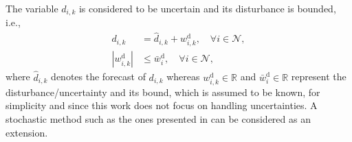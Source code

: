 The variable $d_{i,k}$ is considered to be uncertain and its disturbance is bounded, i.e.,
\begin{align}
{d}_{i,k}&=\hat{d}_{i,k} + w_{i,k}^{\mathrm{d}}, \quad \forall i \in \mathcal{N}, \label{eq:ul}\\
|w_{i,k}^{\mathrm{d}}| &\leq \bar{w}_{i}^{\mathrm{d}}, \quad \forall i \in \mathcal{N}, \label{eq:w_ul}
\end{align}
where  $\hat{d}_{i,k}$ denotes the forecast of $d_{i,k}$ whereas  $w_{i,k}^{\mathrm{d}} \in \mathbb{R}$ and $\bar{w}_{i}^{\mathrm{d}} \in \mathbb{R}$  represent the disturbance/uncertainty and its bound, which is assumed to be known, for simplicity and since this work does not focus on handling uncertainties. A stochastic method such as the ones presented in \cite{margellos2014,ananduta2019b} can be considered as an extension. %




